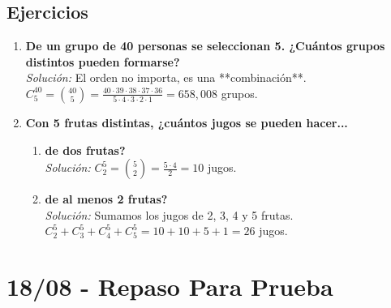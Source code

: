 \documentclass[12pt, letterpaper]{article}
\begin{document}
\subsection{Ejercicios}
\begin{enumerate}
	\item \textbf{De un grupo de 40 personas se seleccionan 5. ¿Cuántos grupos distintos pueden formarse?} \\
	      \textit{Solución:} El orden no importa, es una **combinación**. \\
	      $C_5^{40} = \binom{40}{5} = \frac{40 \cdot 39 \cdot 38 \cdot 37 \cdot 36}{5 \cdot 4 \cdot 3 \cdot 2 \cdot 1} = 658,008$ grupos.

	\item \textbf{Con 5 frutas distintas, ¿cuántos jugos se pueden hacer...}
	      \begin{enumerate}
		      \item \textbf{de dos frutas?} \\
		            \textit{Solución:} $C_2^5 = \binom{5}{2} = \frac{5 \cdot 4}{2} = 10$ jugos.
		      \item \textbf{de al menos 2 frutas?} \\
		            \textit{Solución:} Sumamos los jugos de 2, 3, 4 y 5 frutas. \\
		            $C_2^5 + C_3^5 + C_4^5 + C_5^5 = 10 + 10 + 5 + 1 = 26$ jugos.
	      \end{enumerate}
\end{enumerate}
\newpage

\section{18/08 - Repaso Para Prueba}
\end{document}
